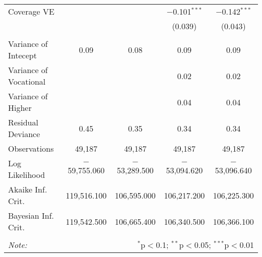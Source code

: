 \documentclass[alpha-refs]{wiley-article-04t}
\begin{document}
\begin{table}[!htbp]
\begin{tabular}{@{\extracolsep{5pt}}lcccc}
		Coverage VE &  &  & $-$0.101$^{***}$ & $-$0.142$^{***}$ \\ 
		&  &  & (0.039) & (0.043) \\ 
		& & & & \\ 
		\hline
		\hline
		Variance of Intecept & 0.09 & 0.08 & 0.09 & 0.09 \\ 
		Variance of Vocational &  &  & 0.02 & 0.02 \\ 
		Variance of Higher &  &  & 0.04 & 0.04 \\ 
		Residual Deviance & 0.45 & 0.35 & 0.34 & 0.34 \\ 
		\hline
		\hline
		Observations & 49,187 & 49,187 & 49,187 & 49,187 \\ 
		Log Likelihood & $-$59,755.060 & $-$53,289.500 & $-$53,094.620 & $-$53,096.640 \\ 
		Akaike Inf. Crit. & 119,516.100 & 106,595.000 & 106,217.200 & 106,225.300 \\ 
		Bayesian Inf. Crit. & 119,542.500 & 106,665.400 & 106,340.500 & 106,366.100 \\ 
		\hline 
		\hline \\[-1.8ex] 
		\textit{Note:}  & \multicolumn{4}{r}{$^{*}$p$<$0.1; $^{**}$p$<$0.05; $^{***}$p$<$0.01} \\ 
	\end{tabular} 
\end{table} 



\newpage
\printbibliography
\end{document}
